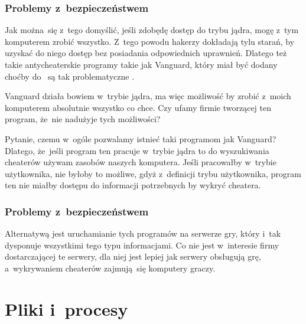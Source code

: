 \documentclass[10pt,t]{beamer}
\begin{document}
\begin{frame}
  \frametitle{Problemy z~bezpieczeństwem}


  Jak można~się z~tego domyślić, jeśli zdobędę dostęp do trybu jądra, mogę
  z~tym komputerem zrobić wszystko. Z~tego powodu hakerzy dokładają tylu
  starań, by uzyskać do niego dostęp \alert{bez} posiadania odpowiednich
  uprawnień. Dlatego też takie antycheaterskie programy takie jak Vanguard,
  który miał być dodany choćby do
  ~są tak problematyczne
  \parencite{Low-Level-Why-Riots-anti-cheat-is-a-HUGE-problem-Ver-2024}.

  Vanguard działa bowiem w~trybie jądra, ma więc możliwość by zrobić
  z~moich komputerem absolutnie wszystko co chce. Czy ufamy firmie
  tworzącej ten program, że~nie nadużyje tych możliwości?

  Pytanie, czemu w~ogóle pozwalamy istnieć taki programom jak Vanguard?
  Dlatego, że~jeśli program ten pracuje w~trybie jądra to do wyszukiwania
  cheaterów używam zasobów \alert{naszych} komputera. Jeśli pracowałby
  w~trybie użytkownika, nie byłoby to możliwe, gdyż z~definicji trybu
  użytkownika, program ten nie miałby dostępu do informacji potrzebnych by
  wykryć cheatera.

\end{frame}





\begin{frame}
  \frametitle{Problemy z~bezpieczeństwem}


  Alternatywą jest uruchamianie tych programów na serwerze
  gry, który i~tak dysponuje wszystkimi tego typu informacjami. Co nie jest
  w~interesie firmy dostarczającej te serwery, dla niej jest lepiej jak
  serwery obsługują grę, a~wykrywaniem cheaterów zajmują~się komputery
  graczy.

\end{frame}










\section{Pliki i~procesy}
\end{document}
